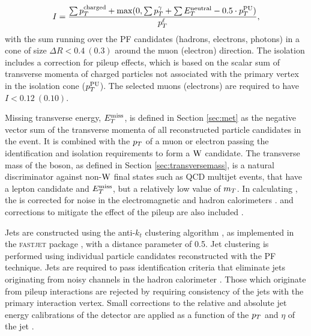 \begin{equation}
\label{eq:iso}
I =\frac{ \sum p_T^{\mathrm{charged}}+{\mathrm{max}}(0,\sum p_T^{\gamma}+\sum E_T^{\mathrm{neutral}}-0.5\cdot p_T^{\mathrm{PU}})}{p_T^\ell},
\end{equation}
 with the sum running over the PF candidates (hadrons, electrons, photons)
 in a cone of size $\Delta R < 0.4~(0.3)$ around the muon (electron) direction.
The isolation includes a correction for pileup effects,
 which is based on the scalar sum of transverse momenta of charged particles
 not associated with the primary vertex in the isolation cone 
 ($p_T^{\mathrm{PU}}$).
The selected muons (electrons) are required to
 have $I < 0.12~(0.10)$.

Missing transverse energy, $E_T^{\mathrm{miss}}$, is defined in Section \ref{sec:met}
 as the negative vector sum of the transverse momenta
 of all reconstructed particle candidates in the event.
 It is  combined with the $p_T$ of a muon or electron passing
 the identification and isolation requirements to form a $\mathrm{W}$ candidate.
%
The transverse mass of the \w boson, as defined in Section \ref{sec:transversemass},
  is a  natural discriminator against non-$\mathrm{W}$ final states
 such as QCD multijet events,
 that have a lepton candidate and $E_T^{\mathrm{miss}}$,
 but a relatively low value of $m_T$.
In calculating \mt, the \met is corrected for noise in the
 electromagnetic and hadron calorimeters \cite{WZCMS:2010}.
 and corrections to mitigate the effect of the
 pileup are also included \cite{CMS:8TeVMET}.

Jets are constructed using the anti-$k_t$ clustering algorithm \cite{Cacciari:2008gp},
 as implemented in the \textsc{fastjet} package \cite{fastjet1,fastjet2},
 with a distance parameter of 0.5.
Jet clustering is performed using individual particle candidates reconstructed with the PF technique.
Jets are required to pass identification
 criteria that eliminate jets originating from
 noisy channels in the hadron calorimeter \cite{Chatrchyan:2009hy}.
Those which originate from pileup interactions are
 rejected by requiring consistency of the jets
 with the primary interaction vertex.
Small corrections to the relative and absolute jet energy calibrations of the detector are
 applied as a function of the $p_T$ and $\eta$  of the jet \cite{cmsJEC}.

